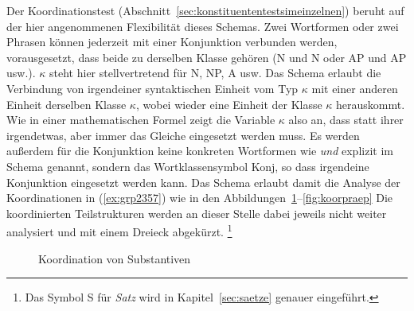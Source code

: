 

Der Koordinationstest (Abschnitt~\ref{sec:konstituententestsimeinzelnen}) beruht auf der hier angenommenen Flexibilität dieses Schemas.
Zwei Wortformen oder zwei Phrasen können jederzeit mit einer Konjunktion verbunden werden, vorausgesetzt, dass beide zu derselben Klasse gehören (N und N oder AP und AP usw.).
$\kappa$ steht hier stellvertretend für N, NP, A usw.
Das Schema erlaubt die Verbindung von irgendeiner syntaktischen Einheit vom Typ $\kappa$ mit einer anderen Einheit derselben Klasse $\kappa$, wobei wieder eine Einheit der Klasse $\kappa$ herauskommt.
Wie in einer mathematischen Formel zeigt die Variable $\kappa$ also an, dass statt ihrer irgendetwas, aber immer das Gleiche eingesetzt werden muss.
Es werden außerdem für die Konjunktion keine konkreten Wortformen wie \textit{und} explizit im Schema genannt, sondern das Wortklassensymbol Konj, so dass irgendeine Konjunktion eingesetzt werden kann.
Das Schema erlaubt damit die Analyse der Koordinationen in (\ref{ex:grp2357}) wie in den Abbildungen~\ref{fig:koorsubst}--\ref{fig:koorpraep}
Die koordinierten Teilstrukturen werden an dieser Stelle dabei jeweils nicht weiter analysiert und mit einem Dreieck abgekürzt.%
\footnote{Das Symbol S für \textit{Satz} wird in Kapitel~\ref{sec:saetze} genauer eingeführt.}

\begin{exe}
  \ex\label{ex:grp2357}
  \begin{xlist}
  \end{xlist}
\end{exe}

\begin{figure}
  \centering
  \caption{Koordination von Substantiven}
  \label{fig:koorsubst}
\end{figure}

